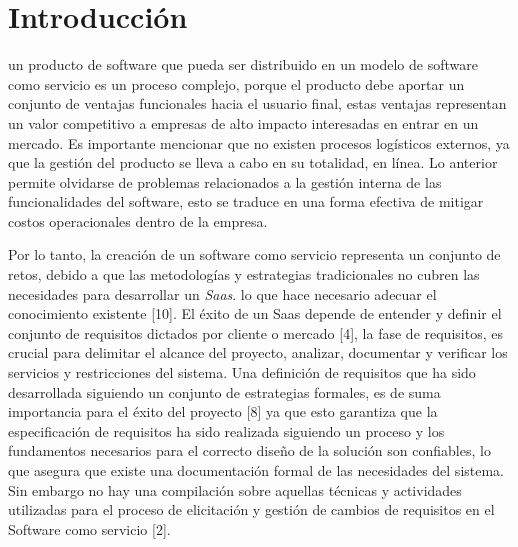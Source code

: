\documentclass[conference,onecolumn,10pt]{IEEEtran}
\begin{document}
\section{Introducción}
% 
% 
% 
% 
 un producto de software que pueda ser distribuido en un modelo de software como servicio 
es un proceso complejo, porque el producto debe aportar un conjunto de ventajas funcionales hacia el usuario final, estas ventajas
representan un valor competitivo a empresas de alto impacto interesadas en entrar en un mercado. Es importante mencionar que no existen procesos logísticos 
externos, ya que la gestión del producto se lleva a cabo en su totalidad, en línea. Lo anterior permite olvidarse de problemas relacionados a la gestión interna de
las funcionalidades del software, esto se traduce en una forma efectiva de mitigar costos operacionales dentro de la empresa.

Por lo tanto, la creación de un software como servicio representa un conjunto de retos, debido a que las metodologías y estrategias tradicionales no cubren
las necesidades para desarrollar un \emph{Saas}. lo que hace necesario adecuar el conocimiento existente [10]. El éxito de un Saas depende de entender y definir el
conjunto de requisitos dictados por cliente o mercado [4], la fase de requisitos, es crucial para delimitar el alcance del proyecto, analizar, documentar y verificar
los servicios y restricciones del sistema. Una definición de requisitos que ha sido desarrollada siguiendo un conjunto de estrategias formales, es de suma importancia 
para el éxito del proyecto [8] ya que esto garantiza que la especificación de requisitos ha sido realizada siguiendo un proceso y los fundamentos necesarios
para el correcto diseño de la solución son confiables, lo que asegura que existe una documentación formal de las necesidades del sistema. Sin embargo no hay una 
compilación sobre aquellas técnicas y actividades utilizadas para el proceso de elicitación y gestión de cambios de requisitos en el Software como servicio [2].
\end{document}
